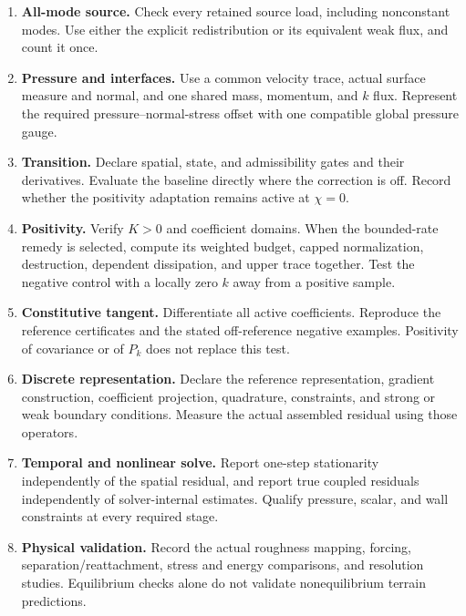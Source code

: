 \documentclass[11pt,a4paper]{article}
\numberwithin{equation}{section}
\begin{document}
\begin{enumerate}
the same profile. Apply the finite-viscosity production-budget
cutoff and its gate. Do not independently prescribe both outer
dissipation trace and flux at the matching surface.
\item \textbf{All-mode source.} Check every retained source load,
including nonconstant modes. Use either the explicit redistribution
or its equivalent weak flux, and count it once.
\item \textbf{Pressure and interfaces.} Use a common velocity trace,
actual surface measure and normal, and one shared mass, momentum,
and $k$ flux. Represent the required pressure--normal-stress offset
with one compatible global pressure gauge.
\item \textbf{Transition.} Declare spatial, state, and admissibility
gates and their derivatives. Evaluate the baseline directly where
the correction is off. Record whether the positivity adaptation
remains active at $\chi=0$.
\item \textbf{Positivity.} Verify $K>0$ and coefficient domains.
When the bounded-rate remedy is selected, compute its weighted
budget, capped normalization, destruction, dependent dissipation,
and upper trace together. Test the negative control with a
locally zero $k$ away from a positive sample.
\item \textbf{Constitutive tangent.} Differentiate all active
coefficients. Reproduce the reference certificates and the stated
off-reference negative examples. Positivity of covariance or of
$P_k$ does not replace this test.
\item \textbf{Discrete representation.} Declare the reference
representation, gradient construction, coefficient projection,
quadrature, constraints, and strong or weak boundary conditions.
Measure the actual assembled residual using those operators.
\item \textbf{Temporal and nonlinear solve.} Report one-step
stationarity independently of the spatial residual, and report
true coupled residuals independently of solver-internal estimates.
Qualify pressure, scalar, and wall constraints at every required
stage.
\item \textbf{Physical validation.} Record the actual roughness
mapping, forcing, separation/reattachment, stress and energy
comparisons, and resolution studies. Equilibrium checks alone do
not validate nonequilibrium terrain predictions.
\end{enumerate}
\end{document}
